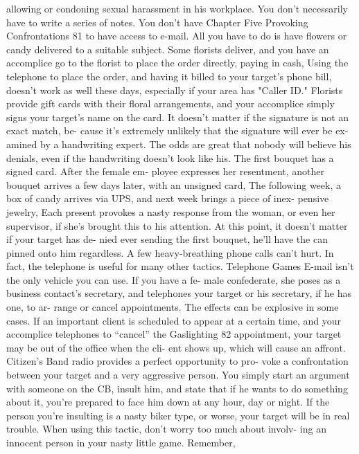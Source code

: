\documentclass{book}
\begin{document}
allowing or condoning sexual harassment in his workplace. You 
don't necessarily have to write a series of notes. You don't have 
Chapter Five 
Provoking Confrontations 
81 
to have access to e-mail. All you have to do is have flowers or 
candy delivered to a suitable subject. 
Some florists deliver, and you have an accomplice go to the 
florist to place the order directly, paying in cash, Using the 
telephone to place the order, and having it billed to your target's 
phone bill, doesn't work as well these days, especially if your 
area has "Caller ID." 
Florists provide gift cards with their floral arrangements, 
and your accomplice simply signs your target's name on the 
card. It doesn't matter if the signature is not an exact match, be- 
cause it's extremely unlikely that the signature will ever be ex- 
amined by a handwriting expert. The odds are great that nobody 
will believe his denials, even if the handwriting doesn't look 
like his. 
The first bouquet has a signed card. After the female em- 
ployee expresses her resentment, another bouquet arrives a few 
days later, with an unsigned card, The following week, a box of 
candy arrives via UPS, and next week brings a piece of inex- 
pensive jewelry, Each present provokes a nasty response from 
the woman, or even her supervisor, if she’s brought this to his 
attention. At this point, it doesn't matter if your target has de- 
nied ever sending the first bouquet, he'll have the can pinned 
onto him regardless. A few heavy-breathing phone calls can't 
hurt. In fact, the telephone is useful for many other tactics. 
Telephone Games 
E-mail isn't the only vehicle you can use. If you have a fe- 
male confederate, she poses as a business contact’s secretary, 
and telephones your target or his secretary, if he has one, to ar- 
range or cancel appointments. The effects can be explosive in 
some cases. If an important client is scheduled to appear at a 
certain time, and your accomplice telephones to “cancel” the  Gaslighting 
82 
appointment, your target may be out of the office when the cli- 
ent shows up, which will cause an affront. 
Citizen's Band radio provides a perfect opportunity to pro- 
voke a confrontation between your target and a very aggressive 
person. You simply start an argument with someone on the CB, 
insult him, and state that if he wants to do something about it, 
you're prepared to face him down at any hour, day or night. If 
the person you're insulting is a nasty biker type, or worse, your 
target will be in real trouble. 
When using this tactic, don't worry too much about involv- 
ing an innocent person in your nasty little game. Remember, 
\end{document}
